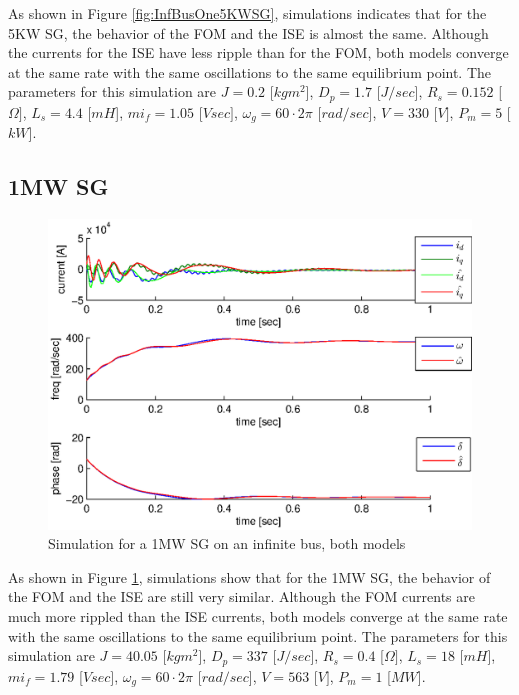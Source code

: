 \documentclass[conference]{IEEEtran}
\begin{document}
As shown in Figure \ref{fig:InfBusOne5KWSG}, simulations indicates
that for the 5KW SG, the behavior of the FOM and the ISE is almost the
same. Although the currents for the ISE have less ripple than for
the FOM, both models converge at the same rate with the same
oscillations to the same equilibrium point. The parameters for this
simulation are $J=0.2$ {[}$kgm^{2}${]}, $D_{p}=1.7$ {[}$J/sec${]},
$R_{s}=0.152$ {[}$\Omega]$, $L_{s}=4.4$ {[}$mH${]}, $mi_{f}=1.05$
{[}$Vsec]$, $\omega_{g}=60\cdotp2\pi$ {[}$rad/sec${]}, $V=330$
{[}$V]$, $P_m=5$ {[}$kW${]}.

\subsection{1MW SG}
\vspace{-4mm}
\begin{figure}[ht]
\includegraphics[scale=0.6]{sim1MWInfBus}

\caption{Simulation for a 1MW SG on an infinite bus, both models}
\label{fig:InfBusOne1MWSG}
\end{figure}

As shown in Figure \ref{fig:InfBusOne1MWSG}, simulations show that for
the 1MW SG, the behavior of the FOM and the ISE are still very
similar. Although the FOM currents are much more rippled than the ISE
currents, both models converge at the same rate with the same
oscillations to the same equilibrium point. The parameters for this
simulation are $J=40.05$ {[}$kgm^{2}${]}, $D_{p}=337$ {[}$J/sec${]},
$R_{s}=0.4$ {[}$\Omega]$, $L_{s}=18$ {[}$mH${]}, $mi_{f}=1.79$
{[}$Vsec]$, $\omega_{g}=60\cdotp2\pi$ {[}$rad/sec${]}, $V=563$
{[}$V]$, $P_m=1$ {[}$MW${]}.
\end{document}
